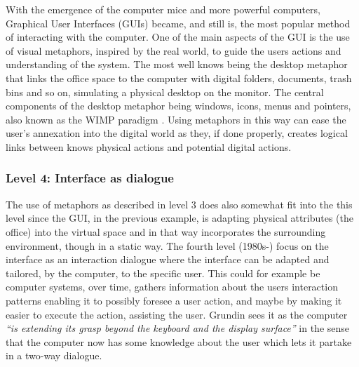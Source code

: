 With the emergence of the computer mice and more powerful computers, Graphical User Interfaces (GUIs) became, and still is, the most popular method of interacting with the computer.
One of the main aspects of the GUI is the use of visual metaphors, inspired by the real world, to guide the users actions and understanding of the system.
The most well knows being the desktop metaphor that links the office space to the computer with digital folders, documents, trash bins and so on, simulating a physical desktop on the monitor.
The central components of the desktop metaphor being windows, icons, menus and pointers, also known as the WIMP paradigm \citep[chap. 6]{krumm2009ubiquitous}. 
Using metaphors in this way can ease the user's annexation into the digital world as they, if done properly, creates logical links between knows physical actions and potential digital actions.

\subsubsection{Level 4: Interface as dialogue}
The use of metaphors as described in level 3 does also somewhat fit into the this level since the GUI, in the previous example, is adapting physical attributes (the office) into the virtual space and in that way incorporates the surrounding environment, though in a static way.
The fourth level (1980s-) focus on the interface as an interaction dialogue where the interface can be adapted and tailored, by the computer, to the specific user.
This could for example be computer systems, over time, gathers information about the users interaction patterns enabling it to possibly foresee a user action, and maybe by making it easier to execute the action, assisting the user.
Grundin sees it as the computer \emph{``is extending its grasp beyond the keyboard and the display surface''} in the sense that the computer now has some knowledge about the user which lets it partake in a two-way dialogue.

